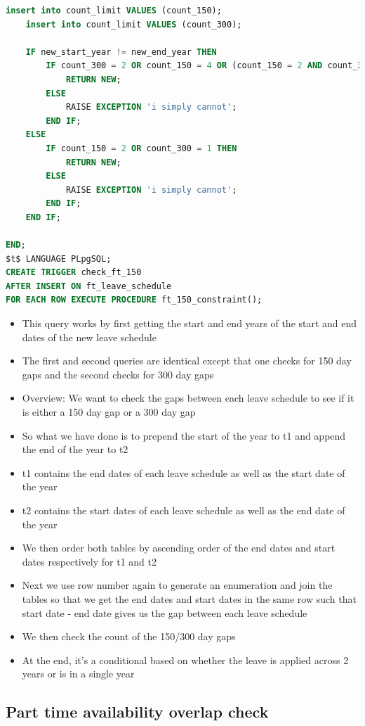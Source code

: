 \documentclass[
  paper=a4,
  ,captions=tableheading
]{scrartcl}
\providecommand{\tightlist}{%
  \setlength{\itemsep}{0pt}\setlength{\parskip}{0pt}}
\begin{document}
\begin{lstlisting}[language=SQL]
    insert into count_limit VALUES (count_150);
    insert into count_limit VALUES (count_300);

    IF new_start_year != new_end_year THEN
        IF count_300 = 2 OR count_150 = 4 OR (count_150 = 2 AND count_300 = 1) THEN
            RETURN NEW;
        ELSE
            RAISE EXCEPTION 'i simply cannot';
        END IF;
    ELSE
        IF count_150 = 2 OR count_300 = 1 THEN
            RETURN NEW;
        ELSE
            RAISE EXCEPTION 'i simply cannot';
        END IF;
    END IF;

END;
$t$ LANGUAGE PLpgSQL;
CREATE TRIGGER check_ft_150
AFTER INSERT ON ft_leave_schedule
FOR EACH ROW EXECUTE PROCEDURE ft_150_constraint();
\end{lstlisting}

\begin{itemize}
\tightlist
\item
  This query works by first getting the start and end years of the start
  and end dates of the new leave schedule
\item
  The first and second queries are identical except that one checks for
  150 day gaps and the second checks for 300 day gaps
\item
  Overview: We want to check the gaps between each leave schedule to see
  if it is either a 150 day gap or a 300 day gap
\item
  So what we have done is to prepend the start of the year to t1 and
  append the end of the year to t2
\item
  t1 contains the end dates of each leave schedule as well as the start
  date of the year
\item
  t2 contains the start dates of each leave schedule as well as the end
  date of the year
\item
  We then order both tables by ascending order of the end dates and
  start dates respectively for t1 and t2
\item
  Next we use row number again to generate an enumeration and join the
  tables so that we get the end dates and start dates in the same row
  such that start date - end date gives us the gap between each leave
  schedule
\item
  We then check the count of the 150/300 day gaps
\item
  At the end, it's a conditional based on whether the leave is applied
  across 2 years or is in a single year
\end{itemize}

\hypertarget{part-time-availability-overlap-check}{%
\subsection{Part time availability overlap
check}\label{part-time-availability-overlap-check}}
\end{document}
